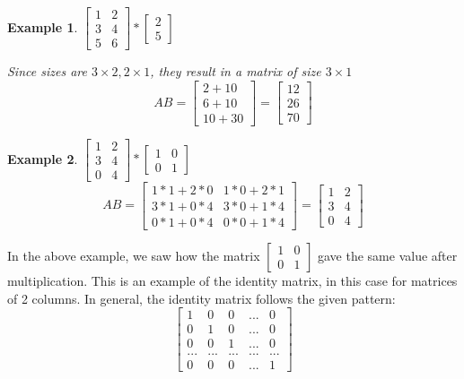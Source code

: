 \documentclass{article}
\newtheorem{example}{Example}
\begin{document}
\begin{example} $\begin{bmatrix} 1 & 2 \\ 3 & 4 \\ 5 & 6 \end{bmatrix} * \begin{bmatrix} 2 \\ 5 \end{bmatrix}$
	
	Since sizes are $3\times 2, 2\times 1$, they result in a matrix of size $3\times 1$
	$$AB=\begin{bmatrix} 2+10 \\ 6 + 10 \\ 10 + 30\end{bmatrix}=\begin{bmatrix}12\\26\\70\end{bmatrix}$$
\end{example}

\begin{example} $\begin{bmatrix} 1&2\\3&4\\0&4\end{bmatrix} * \begin{bmatrix}1&0\\0&1\end{bmatrix}$
	$$AB=\begin{bmatrix} 1*1+2*0 & 1*0+2*1 \\ 3*1+0*4 & 3*0+1*4 \\ 0*1+0*4 & 0*0+1*4\end{bmatrix} = 
	\begin{bmatrix} 1 & 2 \\ 3 & 4 \\ 0 & 4 \end{bmatrix}$$
\end{example}

In the above example, we saw how the matrix $\begin{bmatrix}1&0\\0&1\end{bmatrix} $ gave the same value after multiplication. This is an example of the 
identity matrix, in this case for matrices of 2 columns. In general, the identity matrix follows the given pattern:
$$\begin{bmatrix}1&0&0&...&0\\0&1&0&...&0\\0&0&1&...&0\\...&...&...&...&...\\0&0&0&...&1\end{bmatrix}$$
\end{document}
